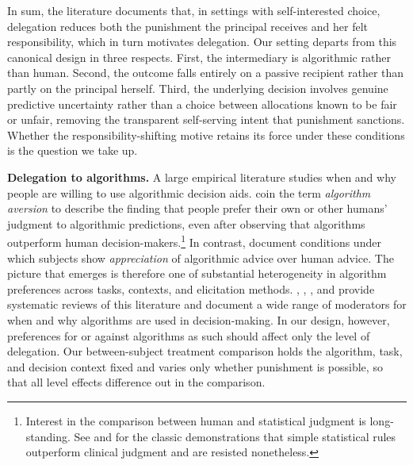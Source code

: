 In sum, the literature documents that, in settings with self-interested choice, delegation reduces both the punishment the principal receives and her felt responsibility, which in turn motivates delegation. Our setting departs from this canonical design in three respects. First, the intermediary is algorithmic rather than human. Second, the outcome falls entirely on a passive recipient rather than partly on the principal herself. Third, the underlying decision involves genuine predictive uncertainty rather than a choice between allocations known to be fair or unfair, removing the transparent self-serving intent that punishment sanctions. Whether the responsibility-shifting motive retains its force under these conditions is the question we take up.


\textbf{Delegation to algorithms.} A large empirical literature studies when and why people are willing to use algorithmic decision aids. \citet{dietvorst_algorithm_2015} coin the term \textit{algorithm aversion} to describe the finding that people prefer their own or other humans' judgment to algorithmic predictions, even after observing that algorithms outperform human decision-makers.\footnote{Interest in the comparison between human and statistical judgment is long-standing. See \citet{meehl_clinical_1954} and \citet{dawes_robust_1979} for the classic demonstrations that simple statistical rules outperform clinical judgment and are resisted nonetheless.} In contrast, \citet{logg_algorithm_2019} document conditions under which subjects show \textit{appreciation} of algorithmic advice over human advice. The picture that emerges is therefore one of substantial heterogeneity in algorithm preferences across tasks, contexts, and elicitation methods. \citet{burton_systematic_2020}, \citet{mahmud_what_2022}, \citet{chugunova_we_2022}, \citet{qin_ai_2025} and \citet{irlenbusch_human_2026} provide systematic reviews of this literature and document a wide range of moderators for when and why algorithms are used in decision-making. In our design, however, preferences for or against algorithms as such should affect only the level of delegation. Our between-subject treatment comparison holds the algorithm, task, and decision context fixed and varies only whether punishment is possible, so that all level effects difference out in the comparison.

